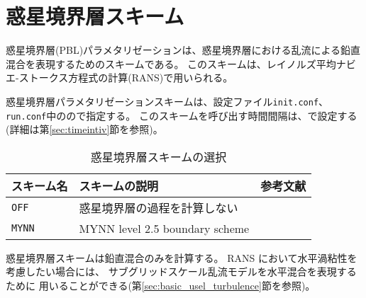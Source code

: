 
\section{惑星境界層スキーム} \label{sec:basic_usel_pbl}

惑星境界層(PBL)パラメタリゼーションは、惑星境界層における乱流による鉛直混合を表現するためのスキームである。
このスキームは、レイノルズ平均ナビエ-ストークス方程式の計算(RANS)で用いられる。

惑星境界層パラメタリゼーションスキームは、設定ファイル\verb|init.conf|、\verb|run.conf|中のので指定する。
このスキームを呼び出す時間間隔は、で設定する(詳細は第\ref{sec:timeintiv}節を参照)。

\begin{table}[h]
\begin{center}
  \caption{惑星境界層スキームの選択}
  \label{tab:nml_atm_bl}
  \begin{tabularx}{150mm}{lXX} \hline
    \rowcolor[gray]{0.9}  スキーム名 & スキームの説明 & 参考文献\\ \hline
      \verb|OFF|          & 惑星境界層の過程を計算しない &  \\
      \verb|MYNN|         & MYNN level 2.5 boundary scheme & \citet{my_1982,nakanishi_2004} \\
    \hline
  \end{tabularx}
\end{center}
\end{table}

惑星境界層スキームは鉛直混合のみを計算する。
RANS において水平渦粘性を考慮したい場合には、
サブグリッドスケール乱流モデルを水平混合を表現するために
用いることができる(第\ref{sec:basic_usel_turbulence}節を参照)。
